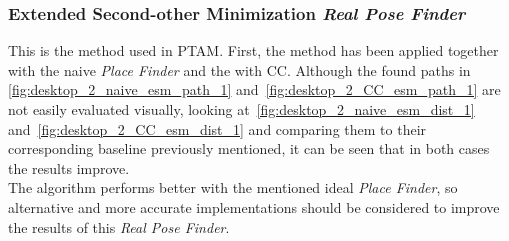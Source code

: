 \subsubsection{Extended Second-other Minimization \textit{Real Pose Finder}}
\label{ssub:extended_second_orther_minimization_textit_real_pose_finder}

This is the method used in PTAM. First, the method has been applied together with the naive \textit{Place Finder} and the with CC. Although the found paths in \ref{fig:desktop_2_naive_esm_path_1} and~\ref{fig:desktop_2_CC_esm_path_1} are not easily evaluated visually, looking at~\ref{fig:desktop_2_naive_esm_dist_1} and~\ref{fig:desktop_2_CC_esm_dist_1} and comparing them to their corresponding baseline previously mentioned, it can be seen that in both cases the results improve.\\

The algorithm performs better with the mentioned ideal \textit{Place Finder}, so alternative and more accurate implementations should be considered to improve the results of this \textit{Real Pose Finder}.\\


